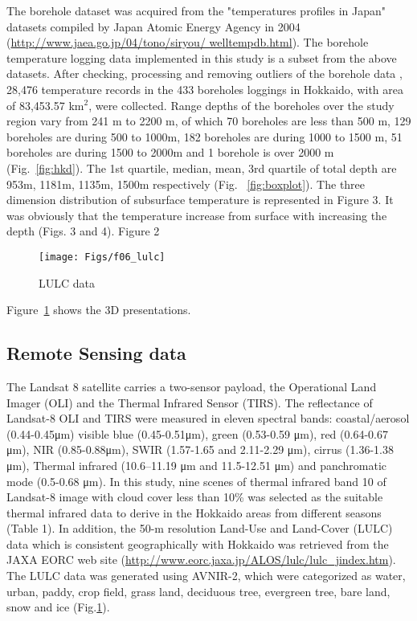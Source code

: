 The borehole dataset was acquired from the "temperatures profiles in Japan" datasets compiled by Japan Atomic Energy Agency in 2004 (\url{http://www.jaea.go.jp/04/tono/siryou/ welltempdb.html}). The borehole temperature logging data implemented in this study is a subset from the above datasets. After checking, processing and removing outliers of the borehole data \cite{Tian2014}, 28,476 temperature records in the 433 boreholes loggings in Hokkaido, with area of 83,453.57 km$^{2}$, were collected. Range depths of the boreholes over the study region vary from 241 m to 2200 m, of which 70 boreholes are less than 500 m, 129 boreholes are during 500 to 1000m, 182 boreholes are during 1000 to 1500 m, 51 boreholes are during 1500 to 2000m and 1 borehole is over 2000 m (Fig.~\ref{fig:hkd}). The 1st quartile, median, mean, 3rd quartile of total depth are 953m, 1181m, 1135m, 1500m respectively (Fig. ~\ref{fig:boxplot}). The three dimension distribution of subsurface temperature is represented in Figure 3. It was obviously that the temperature increase from surface with increasing the depth (Figs. 3 and 4). 
Figure 2 




\begin{figure} [ht!]
    \texttt{[image: Figs/f06\_lulc]}
  \caption{LULC data  }
  \label{fig:lulc}
\end{figure}
Figure~\ref{fig:lulc} shows the 3D presentations.

 

\subsection{Remote Sensing data}

The Landsat 8 satellite carries a two-sensor payload, the Operational Land Imager (OLI) and the Thermal Infrared Sensor (TIRS). The reflectance of Landsat-8 OLI and TIRS were measured in eleven spectral bands: coastal/aerosol (0.44-0.45μm) visible blue (0.45-0.51μm), green (0.53-0.59 μm), red (0.64-0.67 μm), NIR (0.85-0.88μm), SWIR (1.57-1.65 and 2.11-2.29 μm), cirrus (1.36-1.38 μm), Thermal infrared (10.6–11.19 μm and 11.5-12.51 μm) and panchromatic mode (0.5-0.68 μm). In this study, nine scenes of thermal infrared band 10 of Landsat-8 image with cloud cover less than 10\% was selected as the suitable thermal infrared data to derive in the Hokkaido areas from different seasons (Table 1).
In addition, the 50-m resolution Land-Use and Land-Cover (LULC) data which is consistent geographically with Hokkaido was retrieved from the JAXA EORC web site (\url{http://www.eorc.jaxa.jp/ALOS/lulc/lulc_jindex.htm}). The LULC data was generated using AVNIR-2, which were categorized as water, urban, paddy, crop field, grass land, deciduous tree, evergreen tree, bare land, snow and ice (Fig.\ref{fig:lulc}).
